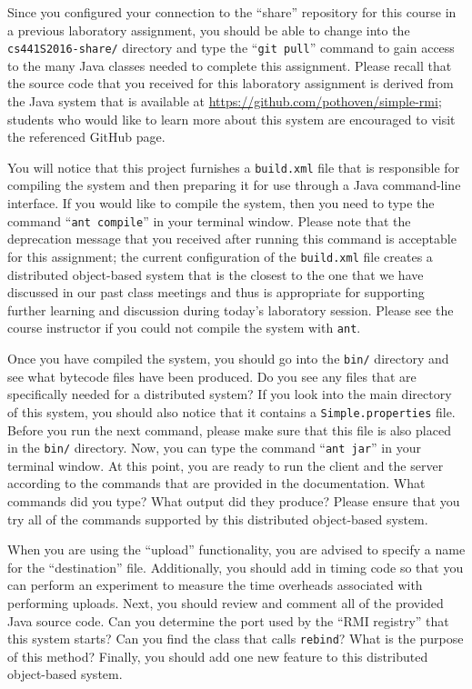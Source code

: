 Since you configured your connection to the ``share'' repository for this course in a previous laboratory assignment,
you should be able to change into the {\tt cs441S2016-share/} directory and type the ``{\tt git pull}'' command to gain
access to the many Java classes needed to complete this assignment. Please recall that the source code that you received
for this laboratory assignment is derived from the Java system that is available at
\url{https://github.com/pothoven/simple-rmi}; students who would like to learn more about this system are encouraged to
visit the referenced GitHub page.

You will notice that this project furnishes a {\tt build.xml} file that is responsible for compiling the system and then
preparing it for use through a Java command-line interface. If you would like to compile the system, then you need to
type the command ``{\tt ant compile}'' in your terminal window. Please note that the deprecation message that you
received after running this command is acceptable for this assignment; the current configuration of the {\tt build.xml}
file creates a distributed object-based system that is the closest to the one that we have discussed in our past class
meetings and thus is appropriate for supporting further learning and discussion during today's laboratory session.
Please see the course instructor if you could not compile the system with {\tt ant}.

Once you have compiled the system, you should go into the {\tt bin/} directory and see what bytecode files have been
produced. Do you see any files that are specifically needed for a distributed system? If you look into the main
directory of this system, you should also notice that it contains a {\tt Simple.properties} file. Before you run the
next command, please make sure that this file is also placed in the {\tt bin/} directory. Now, you can type the command
``{\tt ant jar}'' in your terminal window. At this point, you are ready to run the client and the server according to
the commands that are provided in the documentation. What commands did you type? What output did they produce? Please
ensure that you try all of the commands supported by this distributed object-based system.

When you are using the ``upload'' functionality, you are advised to specify a name for the ``destination'' file.
Additionally, you should add in timing code so that you can perform an experiment to measure the time overheads
associated with performing uploads. Next, you should review and comment all of the provided Java source code.  Can you
determine the port used by the ``RMI registry'' that this system starts? Can you find the class that calls {\tt rebind}?
What is the purpose of this method? Finally, you should add one new feature to this distributed object-based system.

